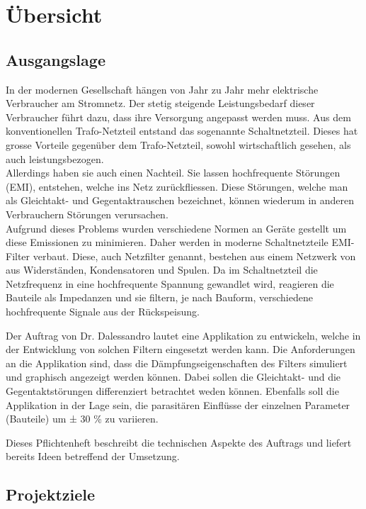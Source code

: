 \section{Übersicht} \label{sec:uebersicht}
\subsection{Ausgangslage}

In der modernen Gesellschaft hängen von Jahr zu Jahr mehr elektrische Verbraucher am Stromnetz. Der stetig steigende Leistungsbedarf dieser Verbraucher führt dazu, dass ihre Versorgung angepasst werden muss. Aus dem konventionellen Trafo-Netzteil entstand das sogenannte Schaltnetzteil. Dieses hat grosse Vorteile gegenüber dem Trafo-Netzteil, sowohl wirtschaftlich gesehen, als auch leistungsbezogen. \\Allerdings haben sie auch einen Nachteil. Sie lassen hochfrequente Störungen (EMI), entstehen, welche ins Netz zurückfliessen. Diese Störungen, welche man als Gleichtakt- und Gegentaktrauschen bezeichnet, können wiederum in anderen Verbrauchern  Störungen verursachen. \\Aufgrund dieses Problems wurden verschiedene Normen an Geräte gestellt um diese Emissionen zu minimieren. Daher werden in moderne Schaltnetzteile EMI-Filter verbaut.  Diese, auch Netzfilter genannt, bestehen aus einem Netzwerk von  aus Widerständen, Kondensatoren und Spulen. Da im Schaltnetzteil die Netzfrequenz in eine hochfrequente Spannung gewandlet wird, reagieren die Bauteile als Impedanzen und sie filtern, je nach Bauform, verschiedene hochfrequente Signale aus der Rückspeisung.


Der Auftrag von Dr. Dalessandro lautet eine Applikation zu entwickeln, welche in der Entwicklung von solchen Filtern eingesetzt werden kann. Die Anforderungen an die Applikation sind, dass die Dämpfungseigenschaften des Filters simuliert und graphisch angezeigt werden können. Dabei sollen die Gleichtakt- und die Gegentaktstörungen differenziert betrachtet weden können. Ebenfalls soll die Applikation in der Lage sein, die parasitären Einflüsse der einzelnen Parameter (Bauteile) um ± 30 \% zu variieren.   


Dieses Pflichtenheft beschreibt die technischen Aspekte des Auftrags und liefert bereits Ideen betreffend der Umsetzung. 
 

\newpage
\subsection{Projektziele} \label{subsec:projektziele}



